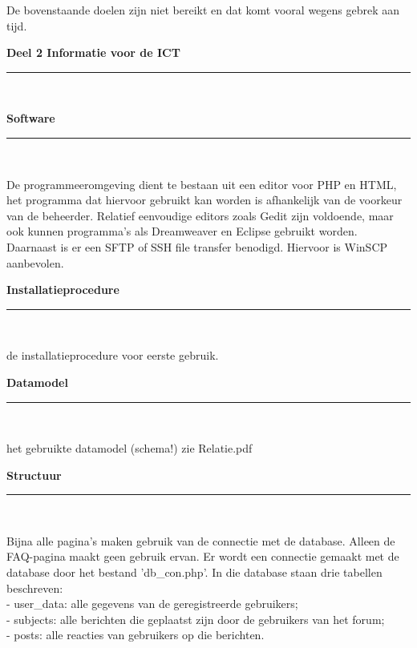 \documentclass[a4paper,12pt]{article}
\newcommand{\HRule}{\rule{\linewidth}{0.5mm}}
\begin{document}
De bovenstaande doelen zijn niet bereikt en dat komt vooral wegens gebrek aan tijd.



\newpage
\begin{center}
{\LARGE \bfseries Deel 2 Informatie voor de ICT}\\[0.1cm]
\HRule \\[0.5cm]
\end{center}


\newpage
\begin{center}
{\LARGE \bfseries Software}\\[0.1cm]
\HRule \\[0.5cm]
\end{center}
De programmeeromgeving dient te bestaan uit een editor voor PHP en HTML, het programma dat hiervoor gebruikt kan worden is afhankelijk van de voorkeur van de beheerder. Relatief eenvoudige editors zoals Gedit zijn voldoende, maar ook kunnen programma's als Dreamweaver en Eclipse gebruikt worden. Daarnaast is er een SFTP of SSH file transfer benodigd. Hiervoor is WinSCP aanbevolen.

\newpage
\begin{center}
{\LARGE \bfseries Installatieprocedure}\\[0.1cm]
\HRule \\[0.5cm]
\end{center}
de installatieprocedure voor eerste gebruik.

\newpage
\begin{center}
{\LARGE \bfseries Datamodel}\\[0.1cm]
\HRule \\[0.5cm]
\end{center}
het gebruikte datamodel (schema!)
zie Relatie.pdf

\newpage
\begin{center}
{\LARGE \bfseries Structuur}\\[0.1cm]
\HRule \\[0.5cm]
\end{center}

Bijna alle pagina’s maken gebruik van de connectie met de database. Alleen de FAQ-pagina maakt geen gebruik ervan. Er wordt een connectie gemaakt met de database door het bestand 'db\_con.php'. In die database staan drie tabellen beschreven: \\
-	user\_data: alle gegevens van de geregistreerde gebruikers;\\
-	subjects: alle berichten die geplaatst zijn door de gebruikers van het forum;\\
-	posts: alle reacties van gebruikers op die berichten.
\end{document}
